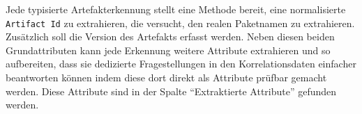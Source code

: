 Jede typisierte Artefakterkennung stellt eine Methode bereit, eine normalisierte \texttt{Artifact Id} zu extrahieren, die versucht, den realen Paketnamen zu extrahieren.
Zusätzlich soll die Version des Artefakts erfasst werden.
Neben diesen beiden Grundattributen kann jede Erkennung weitere Attribute extrahieren und so aufbereiten, dass sie dedizierte Fragestellungen in den Korrelationsdaten einfacher beantworten können indem diese dort direkt als Attribute prüfbar gemacht werden.
Diese Attribute sind in der Spalte \enquote{Extraktierte Attribute} gefunden werden.

\begin{table}
\end{table}
